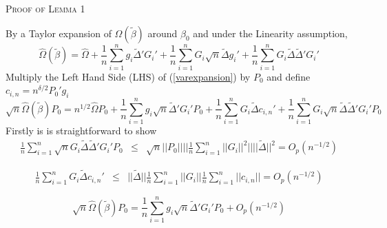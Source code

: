 \documentclass[11pt, fleqn]{article}
\begin{document}
\textsc{Proof of Lemma 1}

By a Taylor expansion of $\hat{\Omega}(\tilde{\beta})$ around $\beta_0$ and under the Linearity assumption,
\begin{equation}\label{varexpansion}\hat{\Omega}(\tilde{\beta})=\hat{\Omega}+\frac{1}{n}\sum_{i=1}^ng_i\tilde{\Delta}'G_i'+
\frac{1}{n}\sum_{i=1}^n G_i \sqrt{n}\tilde{\Delta}g_i'+\frac{1}{n}\sum_{i=1}^n G_i\tilde{\Delta}\tilde{\Delta}' G_i'\end{equation}
Multiply the Left Hand Side (LHS) of (\ref{varexpansion}) by $P_0$ and define $c_{i,n}=n^{\delta/2}P_0'g_i$
\begin{equation}\sqrt{n}\hat{\Omega}(\tilde{\beta})P_0=n^{1/2}\hat{\Omega}P_0+ \frac{1}{n}\sum_{i=1}^ng_i\sqrt{n}\tilde{\Delta}'G_i' P_0 +\frac{1}{n}\sum_{i=1}^n G_i\tilde{\Delta} c_{i,n}'+\frac{1}{n}\sum_{i=1}^n G_i\sqrt{n}\tilde{\Delta}\tilde{\Delta}' G_i'P_0 \end{equation}
Firstly is is  straightforward to show 
\begin{eqnarray}
\frac{1}{n}\sum_{i=1}^n \sqrt{n}G_i\tilde{\Delta}\tilde{\Delta}' G_i'P_0
&\leq& \sqrt{n}|\!|P_0|\!||\!|\frac{1}{n}\sum_{i=1}^n|\!|G_i|\!|^2|\!||\!|\tilde{\Delta}|\!|^2 =O_p(n^{-1/2})
\end{eqnarray}

\begin{eqnarray}
\frac{1}{n}\sum_{i=1}^n G_i\tilde{\Delta} c_{i,n}'&\leq& |\!|\tilde{\Delta}|\!|\frac{1}{n}\sum_{i=1}^n|\!|G_i|\!|\frac{1}{n}\sum_{i=1}^n|\!|c_{i,n}|\!|=O_p(n^{-1/2})
\end{eqnarray}

\begin{equation}\sqrt{n}\hat{\Omega}(\tilde{\beta})P_0= \frac{1}{n}\sum_{i=1}^ng_i\sqrt{n}\tilde{\Delta}'G_i' P_0 +O_p(n^{-1/2}) \end{equation}
\end{document}
